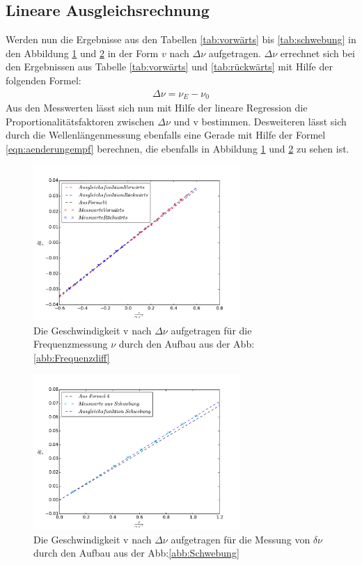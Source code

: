 \subsection{Lineare Ausgleichsrechnung}
Werden nun die Ergebnisse aus den Tabellen \ref{tab:vorwärts} bis \ref{tab:schwebung}
in den Abbildung \ref{abb:freq} und \ref{abb:schw} in der Form $v$ nach $\Delta\nu$ aufgetragen.
$\Delta\nu$ errechnet sich bei den Ergebnissen aus Tabelle \ref{tab:vorwärts} und \ref{tab:rückwärts}
mit Hilfe der folgenden Formel:
\begin{align}
\Delta\nu=\nu_E-\nu_0
\end{align}
Aus den Messwerten lässt sich nun mit Hilfe der lineare Regression
die Proportionalitätsfaktoren zwischen $\Delta\nu$ und v bestimmen.
Desweiteren lässt sich durch die Wellenlängenmessung ebenfalls eine Gerade mit Hilfe der Formel \eqref{eqn:aenderungempf}
berechnen, die ebenfalls in Abbildung \ref{abb:freq} und \ref{abb:schw} zu sehen ist.
\begin{figure}
\centering
\includegraphics[width=0.7\textwidth]{graph.pdf}
\caption{Die Geschwindigkeit v nach $\Delta\nu $ aufgetragen für die Frequenzmessung $\nu$ durch den Aufbau aus der Abb:\ref{abb:Frequenzdiff}}
\label{abb:freq}
\end{figure}
\begin{figure}
\centering
\includegraphics[width=0.7\textwidth]{graph2.pdf}
\caption{Die Geschwindigkeit v nach $\Delta\nu $ aufgetragen für die Messung von $\delta\nu$ durch den Aufbau aus der Abb:\ref{abb:Schwebung}}
\label{abb:schw}
\end{figure}
